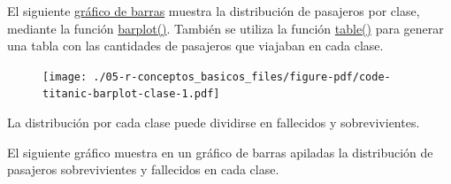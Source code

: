 \documentclass[
  letterpaper,
  DIV=11,
  numbers=noendperiod]{scrreprt}
\newenvironment{Shaded}{\begin{snugshade}}{\end{snugshade}}
\newcommand{\AttributeTok}[1]{\textcolor[rgb]{0.40,0.45,0.13}{#1}}
\newcommand{\CommentTok}[1]{\textcolor[rgb]{0.37,0.37,0.37}{#1}}
\newcommand{\DocumentationTok}[1]{\textcolor[rgb]{0.37,0.37,0.37}{\textit{#1}}}
\newcommand{\FunctionTok}[1]{\textcolor[rgb]{0.28,0.35,0.67}{#1}}
\newcommand{\NormalTok}[1]{\textcolor[rgb]{0.00,0.23,0.31}{#1}}
\newcommand{\SpecialCharTok}[1]{\textcolor[rgb]{0.37,0.37,0.37}{#1}}
\newcommand{\StringTok}[1]{\textcolor[rgb]{0.13,0.47,0.30}{#1}}
\begin{document}
El siguiente
\href{https://es.wikipedia.org/wiki/Diagrama_de_barras}{gráfico de
barras} muestra la distribución de pasajeros por clase, mediante la
función \href{https://rdrr.io/r/graphics/barplot.html}{barplot()}.
También se utiliza la función
\href{https://rdrr.io/r/base/table.html}{table()} para generar una tabla
con las cantidades de pasajeros que viajaban en cada clase.

\begin{Shaded}
\end{Shaded}

\begin{figure}[H]

{\centering \texttt{[image: ./05-r-conceptos\_basicos\_files/figure-pdf/code-titanic-barplot-clase-1.pdf]}

}

\end{figure}

La distribución por cada clase puede dividirse en fallecidos y
sobrevivientes.

\begin{Shaded}
\end{Shaded}

El siguiente gráfico muestra en un gráfico de barras apiladas la
distribución de pasajeros sobrevivientes y fallecidos en cada clase.
\end{document}
